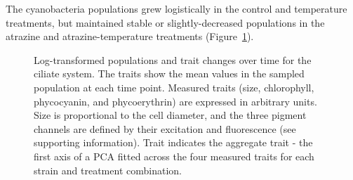 \documentclass[
  letterpaper,
  DIV=11,
  numbers=noendperiod]{scrartcl}
\begin{document}
The cyanobacteria populations grew logistically in the control and
temperature treatments, but maintained stable or slightly-decreased
populations in the atrazine and atrazine-temperature treatments
(Figure~\ref{fig-cyano-pop-traits-time}).

\begin{figure}


\caption{\label{fig-cyano-pop-traits-time}Log-transformed populations
and trait changes over time for the ciliate system. The traits show the
mean values in the sampled population at each time point. Measured
traits (size, chlorophyll, phycocyanin, and phycoerythrin) are expressed
in arbitrary units. Size is proportional to the cell diameter, and the
three pigment channels are defined by their excitation and fluorescence
(see supporting information). Trait indicates the aggregate trait - the
first axis of a PCA fitted across the four measured traits for each
strain and treatment combination.}

\end{figure}%
\end{document}
